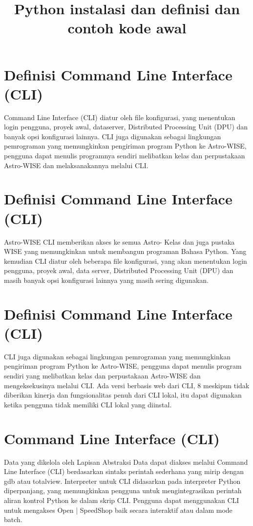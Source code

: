 \documentclass[12pt, times new roman, a4paper]{article}
\begin{document}
\title{Python instalasi dan definisi dan contoh kode awal}
\maketitle


\section{Definisi Command Line Interface (CLI)}
Command Line Interface (CLI) diatur oleh file konfigurasi, yang menentukan login pengguna, proyek awal, dataserver, Distributed Processing Unit (DPU) dan banyak opsi konfigurasi lainnya. CLI juga digunakan sebagai lingkungan pemrograman yang memungkinkan pengiriman program Python ke Astro-WISE, pengguna dapat menulis programnya sendiri melibatkan kelas dan perpustakaan Astro-WISE dan melaksanakannya melalui CLI.

\section{Definisi Command Line Interface (CLI)}
Astro-WISE CLI memberikan  akses ke semua Astro- Kelas dan juga  pustaka WISE yang memungkinkan untuk membangun programan  Bahasa Python. Yang kemudian CLI diatur oleh beberapa file konfigurasi, yang akan menentukan login pengguna, proyek awal, data server, Distributed Processing Unit (DPU) dan masih banyak opsi konfigurasi lainnya yang masih  sering digunakan.

\section{Definisi Command Line Interface (CLI)}
CLI juga digunakan sebagai lingkungan pemrograman yang memungkinkan pengiriman program Python ke Astro-WISE, pengguna dapat menulis program sendiri yang melibatkan kelas dan perpustakaan Astro-WISE dan mengeksekusinya melalui CLI. Ada versi berbasis web dari CLI, 8 meskipun tidak diberikan kinerja dan fungsionalitas penuh dari CLI lokal, itu dapat digunakan ketika pengguna tidak memiliki CLI lokal yang diinstal.

\section{Command Line Interface (CLI)}
Data yang dikelola oleh Lapisan Abstraksi Data dapat diakses melalui Command Line Interface (CLI) berdasarkan sintaks perintah sederhana yang mirip dengan gdb atau totalview. Interpreter untuk CLI didasarkan pada interpreter Python diperpanjang, yang memungkinkan pengguna untuk mengintegrasikan perintah aliran kontrol Python ke dalam skrip CLI. Pengguna dapat menggunakan CLI untuk mengakses Open | SpeedShop baik secara interaktif atau dalam mode batch.
\end{document}
